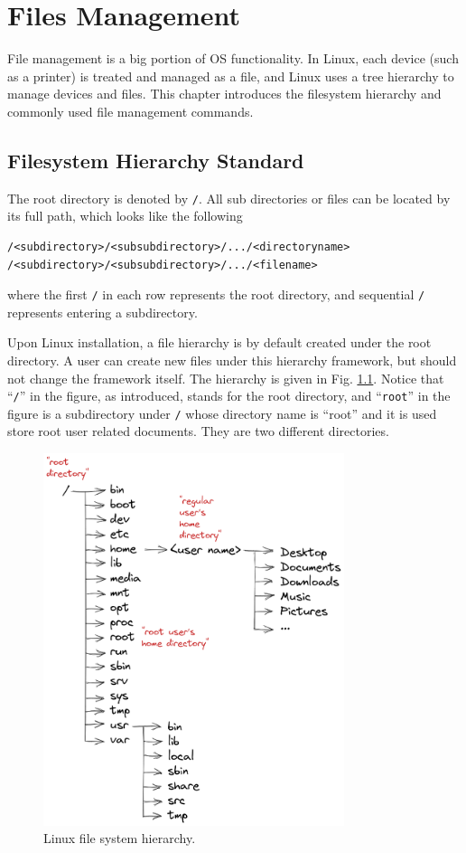 \chapter{Files Management} \label{ch4}

File management is a big portion of OS functionality. In Linux, each device (such as a printer) is treated and managed as a file, and Linux uses a tree hierarchy to manage devices and files. This chapter introduces the filesystem hierarchy and commonly used file management commands.

\section{Filesystem Hierarchy Standard} \label{ch4sec:hierarchy}

The root directory is denoted by \verb|/|. All sub directories or files can be located by its full path, which looks like the following
\begin{lstlisting}
/<subdirectory>/<subsubdirectory>/.../<directoryname>
/<subdirectory>/<subsubdirectory>/.../<filename>
\end{lstlisting}
where the first \verb|/| in each row represents the root directory, and sequential \verb|/| represents entering a subdirectory.

Upon Linux installation, a file hierarchy is by default created under the root directory. A user can create new files under this hierarchy framework, but should not change the framework itself. The hierarchy is given in Fig. \ref{ch4fig:hierarchy}. Notice that ``\verb|/|'' in the figure, as introduced, stands for the root directory, and ``\verb|root|'' in the figure is a subdirectory under \verb|/| whose directory name is ``root'' and it is used store root user related documents. They are two different directories.

\begin{figure}
	\centering
	\includegraphics[width=250pt]{chapters/chapter4/figures/linux_file_hierarchy.png}
	\caption{Linux file system hierarchy.} \label{ch4fig:hierarchy}
\end{figure}

